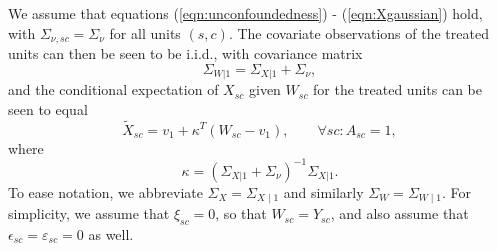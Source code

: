 We assume that equations (\ref{eqn:unconfoundedness}) - (\ref{eqn:Xgaussian}) hold, with  $\Sigma_{\nu,sc} = \Sigma_{\nu}$ for all units $(s,c)$. The covariate observations of the treated units can then be seen to be i.i.d., with covariance matrix
\[ \Sigma_{W|1} = \Sigma_{X|1} + \Sigma_\nu,\]
and the conditional expectation of $X_{sc}$ given $W_{sc}$ for the treated units can be seen to equal
\[ \tilde{X}_{sc} = v_1 + \kappa^T (W_{sc} - v_1), \qquad \forall sc: A_{sc}=1,\]
where
\[ \kappa = (\Sigma_{X|1} + \Sigma_{\nu})^{-1} \Sigma_{X|1}.\]
To ease notation, we abbreviate $\Sigma_X = \Sigma_{X \mid 1}$ and similarly $ \Sigma_W = \Sigma_{W \mid 1}$. For simplicity, we assume that $\xi_{sc} = 0$, so that $W_{sc} = Y_{sc}$, and also assume that $\epsilon_{sc} = \varepsilon_{sc}=0$ as well.



